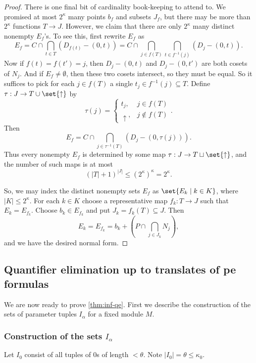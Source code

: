 \documentclass[11pt]{article}
\begin{document}
\begin{proof}
    There is one final bit of cardinality book-keeping to attend to. 
    We promised at most $2^\kappa$ many points $b_f$ and subsets $J_f$, but there may be more than $2^\kappa$ functions $T \to J$. However, we claim that there are only $2^\kappa$ many distinct nonempty $E_f$'s. 
    To see this, first rewrite $E_f$ as
    \[ 
        E_f = C \cap \bigcap_{t \in T} (D_{f(t)} - (0,t)) = C \cap \bigcap_{j \in f(T)} \bigcap_{t \in f^{-1}(j)} (D_j - (0,t)).
    \]
    Now if $f(t) = f(t') = j$, then $D_j - (0,t)$ and $D_j - (0,t')$ are both cosets of $N_j$.
    And if $E_f \neq \emptyset$, then these two cosets intersect, so they must be equal.
    So it suffices to pick for each $j \in f(T)$ a single $t_j \in f^{-1}(j) \subseteq T$. Define $\tau: J \to T \cup \set{\uparrow}$ by 
    \[
        \tau(j) = \begin{cases}
            t_j, & j \in f(T) \\
            \uparrow, & j \not \in f(T)
        \end{cases}.
    \]
    Then
    \[ 
        E_f = C \cap \bigcap_{j \in \tau^{-1}(T)} (D_j - (0,\tau(j))). 
    \]
    Thus every nonempty $E_f$ is determined by some map $\tau: J \to T \sqcup \set{\uparrow}$, and the number of such maps is at most 
    \[ (|T| + 1)^{|J|} \leq (2^\kappa)^\kappa = 2^\kappa. \]
    
    So, we may index the distinct nonempty sets $E_f$ as $\set{E_k \mid k \in K}$, where $|K| \leq 2^\kappa$. For each $k \in K$ choose a representative map $f_k: T \to J$ such that $E_k = E_{f_k}$. Choose $b_k \in E_{f_k}$ and put $J_k = f_k(T) \subseteq J$. Then 
    \[ 
        E_k = E_{f_k} = b_k + \left( P \cap \bigcap_{j \in J_k} N_j \right),
    \]
    and we have the desired normal form.
\end{proof}


\subsection{Quantifier elimination up to translates of pe formulas}

We are now ready to prove \cref{thm:inf-qe}. First we describe the construction of the sets of parameter tuples $I_\alpha$ for a fixed module $M$.

\subsubsection{Construction of the sets $I_\alpha$}

Let $I_0$ consist of all tuples of $0$s of length $< \theta$. Note $|I_0| = \theta \leq \kappa_0$.
\end{document}
